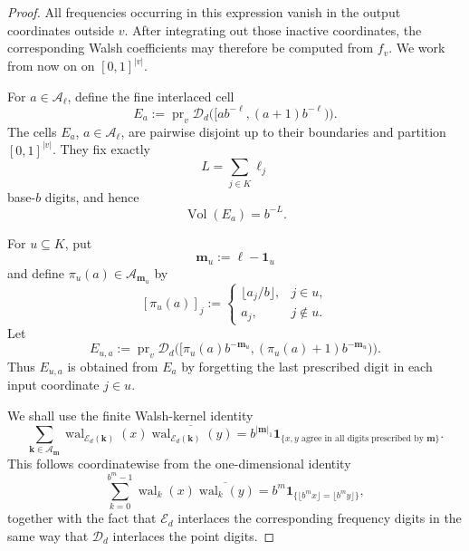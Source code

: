 \documentclass[11pt]{article}
\newcommand{\D}{\mathcal D}
\newcommand{\E}{\mathcal E}
\newcommand{\wal}{\operatorname{wal}}
\newcommand{\Vol}{\operatorname{Vol}}
\begin{document}
\begin{proof}
All frequencies occurring in this expression vanish in the output
coordinates outside $v$.  After integrating out those inactive
coordinates, the corresponding Walsh coefficients may therefore be
computed from $f_v$.  We work from now on on
$[0,1]^{|v|}$.

For $a\in\mathcal A_{\boldsymbol\ell}$, define the fine interlaced
cell
\[
 E_a
 :=
 \operatorname{pr}_v
 \D_d\bigl(
 [ab^{-\boldsymbol\ell},
  (a+1)b^{-\boldsymbol\ell})
 \bigr).
\]
The cells $E_a$, $a\in\mathcal A_{\boldsymbol\ell}$, are pairwise
disjoint up to their boundaries and partition $[0,1]^{|v|}$.  They
fix exactly
\[
 L=\sum_{j\in K}\ell_j
\]
base-$b$ digits, and hence
\begin{equation}\label{eq:Ea-volume-detailed}
 \Vol(E_a)=b^{-L}.
\end{equation}

For $u\subseteq K$, put
\[
 \boldsymbol m_u:=\boldsymbol\ell-\boldsymbol1_u
\]
and define $\pi_u(a)\in\mathcal A_{\boldsymbol m_u}$ by
\[
 [\pi_u(a)]_j
 :=
 \begin{cases}
  \lfloor a_j/b\rfloor, & j\in u,\\
  a_j, & j\notin u.
 \end{cases}
\]
Let
\[
 E_{u,a}
 :=
 \operatorname{pr}_v
 \D_d\bigl(
 [\pi_u(a)b^{-\boldsymbol m_u},
  (\pi_u(a)+1)b^{-\boldsymbol m_u})
 \bigr).
\]
Thus $E_{u,a}$ is obtained from $E_a$ by forgetting the last
prescribed digit in each input coordinate $j\in u$.

We shall use the finite Walsh-kernel identity
\begin{equation}\label{eq:finite-walsh-kernel-detailed}
 \sum_{\boldsymbol k\in\mathcal A_{\boldsymbol m}}
 \wal_{\E_d(\boldsymbol k)}(x)
 \overline{\wal_{\E_d(\boldsymbol k)}(y)}
 =
 b^{|\boldsymbol m|_1}
 \mathbf1_{\{x,y\text{ agree in all digits prescribed by }
                  \boldsymbol m\}}.
\end{equation}
This follows coordinatewise from the one-dimensional identity
\[
 \sum_{k=0}^{b^m-1}
 \wal_k(x)\overline{\wal_k(y)}
 =
 b^m
 \mathbf1_{\{\lfloor b^m x\rfloor=\lfloor b^m y\rfloor\}},
\]
together with the fact that $\E_d$ interlaces the corresponding
frequency digits in the same way that $\D_d$ interlaces the point
digits.


\end{proof}
\end{document}
